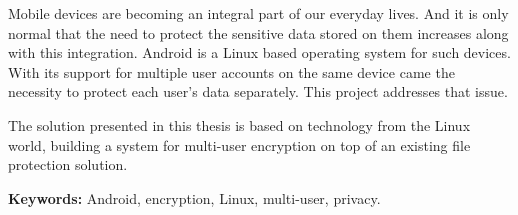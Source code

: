 
Mobile devices are becoming an integral part of our everyday lives. And it is only normal that the need to protect the sensitive data stored on them increases along with this integration. Android is a Linux based operating system for such devices. With its support for multiple user accounts on the same device came the necessity to protect each user's data separately. This project addresses that issue.

The solution presented in this thesis is based on technology from the Linux world, building a system for multi-user encryption on top of an existing file protection solution.

\textbf{Keywords:} Android, encryption, Linux, multi-user, privacy.
